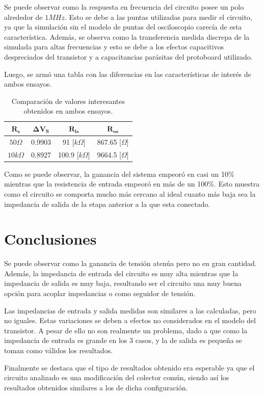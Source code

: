 Se puede observar como la respuesta en frecuencia del circuito posee un polo alrededor de $1MHz$. Esto se debe a las puntas utilizadas para medir el circuito, ya que la simulación sin el modelo de puntas del osciloscopio carecía de esta característica. Además, se observa como la transferencia medida discrepa de la simulada para altas frecuencias y esto se debe a los efectos capacitivos despreciados del transistor y a capacitancias parásitas del protoboard utilizado. 

Luego, se armó una tabla con las diferencias en las características de interés de ambos ensayos.

\begin{table}[H]
\centering
\begin{tabular}{cccc}
\hline $\mathbf{R_s}$ & $\mathbf{\Delta V_S}$ & $\mathbf{R_{is}}$ & $\mathbf{R_{os}}$ \\
\hline
\textbf{$50\Omega$} & 0.9903          & 91 [$k\Omega$]    & 867.65 [$\Omega$]     \\
\textbf{$10k\Omega$}  & 0.8927            & 100.9 [$k\Omega$]   & 9664.5 [$\Omega$]     \\
\hline
\end{tabular}
\caption{Comparación de valores interesantes obtenidos en ambos ensayos.}
\label{tabla:comparacion}
\end{table}

Como se puede observar, la ganancia del sistema empeoró en casi un 10\% mientras que la resistencia de entrada empeoró en más de un 100\%. Esto muestra como el circuito se comporta mucho más cercano al ideal cuanto más baja sea la impedancia de salida de la etapa anterior a la que esta conectado.

\section{Conclusiones}
Se puede observar como la ganancia de tensión atenúa pero no en gran cantidad. Además, la impedancia de entrada del circuito es muy alta mientras que la impedancia de salida es muy baja, resultando ser el circuito una muy buena opción para acoplar impedancias o como seguidor de tensión. 

Las impedancias de entrada y salida medidas son similares a las calculadas, pero no iguales. Estas variaciones se deben a efectos no considerados en el modelo del transistor. A pesar de ello no son realmente un problema, dado a que como la impedancia de entrada es grande en los 3 casos, y la de salida es pequeña se toman como válidos los resultados. 

Finalmente se destaca que el tipo de resultados obtenido era esperable ya que el circuito analizado es una modificación del colector común, siendo así los resultados obtenidos similares a los de dicha configuración.
